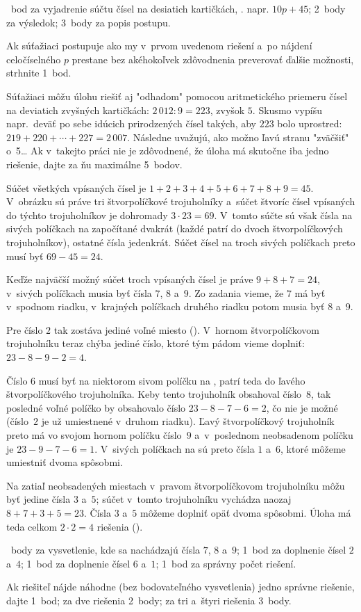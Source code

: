 {~bod za vyjadrenie súčtu čísel na desiatich kartičkách, \tj. napr. $10p+45$;
2~body za výsledok;
3~body za popis postupu.

Ak súťažiaci postupuje ako my v~prvom uvedenom riešení a~po nájdení
celočíselného $p$ prestane bez akéhokoľvek zdôvodnenia preverovať ďalšie
možnosti, strhnite 1~bod.

\poznamka
Súťažiaci môžu úlohu riešiť aj "odhadom" pomocou aritmetického priemeru
čísel na deviatich zvyšných kartičkách: $2\,012:9=223$, zvyšok $5$.
Skusmo vypíšu napr.~deväť po sebe idúcich prirodzených čísel takých, aby
$223$ bolo uprostred: $219+220+\cdots+227=2\,007$.
Následne uvažujú, ako možno ľavú stranu "zväčšiť" o~5\dots{}
Ak v~takejto práci nie je zdôvodnené, že úloha má skutočne iba jedno riešenie,
dajte za ňu maximálne 5~bodov.
\endhodnotenie
}

{%
Súčet všetkých vpísaných čísel je $1+2+3+4+5+6+7+8+9=45$.
V~obrázku sú práve tri štvorpolíčkové trojuholníky a~súčet štvoríc čísel
vpísaných do týchto trojuholníkov je dohromady $3\cdot23=69$.
V~tomto súčte sú však čísla na sivých políčkach na \obr{} započítané dvakrát
(každé patrí do dvoch štvorpolíčkových trojuholníkov), ostatné čísla jedenkrát.
Súčet čísel na troch sivých políčkach preto musí byť $69-45=24$.
%

Keďže najväčší možný súčet troch vpísaných čísel je práve $9+8+7=24$,
v~sivých políčkach musia byť čísla $7$, $8$ a~$9$.
Zo zadania vieme, že $7$ má byť v~spodnom riadku,
v~krajných políčkach druhého riadku potom musia byť $8$ a~$9$.
%

Pre číslo $2$ tak zostáva jediné voľné miesto (\obr).
V~hornom štvorpolíčkovom trojuholníku teraz chýba jediné číslo, ktoré tým pádom
vieme doplniť: $23-8-9-2=4$.
%

Číslo $6$ musí byť na niektorom sivom políčku na \obr, patrí
teda do ľavého štvorpolíčkového trojuholníka.
Keby tento trojuholník obsahoval číslo~$8$, tak posledné voľné políčko
by obsahovalo číslo $23-8-7-6=2$, čo nie je možné (číslo~$2$ je už umiestnené v~druhom riadku).
Ľavý štvorpolíčkový trojuholník preto má vo svojom hornom políčku číslo~$9$
a~v~poslednom neobsadenom políčku je $23-9-7-6=1$.
V~sivých políčkach na  sú preto čísla $1$ a~$6$, ktoré môžeme umiestniť dvoma spôsobmi.

Na zatiaľ neobsadených miestach v~pravom štvorpolíčkovom trojuholníku môžu byť
jedine čísla $3$ a~$5$;
súčet v~tomto trojuholníku vychádza naozaj $8+7+3+5=23$.
Čísla $3$ a~$5$ môžeme doplniť opäť dvoma spôsobmi.
Úloha má teda celkom $2\cdot2=4$ riešenia (\obr).
%

~body za vysvetlenie, kde sa nachádzajú čísla $7$, $8$ a~$9$;
1~bod za doplnenie čísel $2$ a~$4$;
1~bod za doplnenie čísel $6$ a~$1$;
1~bod za správny počet riešení.

Ak riešiteľ nájde náhodne (bez bodovateľného vysvetlenia) jedno správne
riešenie, dajte 1~bod; za dve riešenia 2~body; za tri a~štyri riešenia 3~body.
\endhodnotenie
}


